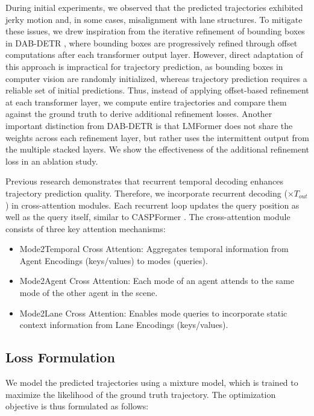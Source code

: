 During initial experiments, we observed that the predicted trajectories exhibited jerky motion and, in some cases, misalignment with lane structures. To mitigate these issues, we drew inspiration from the iterative refinement of bounding boxes in DAB-DETR \cite{liu2022dabdetr}, where bounding boxes are progressively refined through offset computations after each transformer output layer. However, direct adaptation of this approach is impractical for trajectory prediction, as bounding boxes in computer vision are randomly initialized, whereas trajectory prediction requires a reliable set of initial predictions. Thus, instead of applying offset-based refinement at each transformer layer, we compute entire trajectories and compare them against the ground truth to derive additional refinement losses. Another important distinction from DAB-DETR is that LMFormer does not share the weights across each refinement layer, but rather uses the intermittent output from the multiple stacked layers. We show the effectiveness of the additional refinement loss in an ablation study.

Previous research \cite{yadav2025caspformer,zhou2023query} demonstrates that recurrent temporal decoding enhances trajectory prediction quality. Therefore, we incorporate recurrent decoding ($\times T_{out}$) in cross-attention modules. Each recurrent loop updates the query position as well as the query itself, similar to CASPFormer \cite{yadav2025caspformer}. The cross-attention module consists of three key attention mechanisms:
\begin{itemize}
    \item Mode2Temporal Cross Attention: Aggregates temporal information from Agent Encodings (keys/values) to modes (queries).
    \item Mode2Agent Cross Attention: Each mode of an agent attends to the same mode of the other agent in the scene.
    \item Mode2Lane Cross Attention: Enables mode queries to incorporate static context information from Lane Encodings (keys/values).
\end{itemize}

\subsection{Loss Formulation}\label{subsection:loss}
We model the predicted trajectories using a mixture model, which is trained to maximize the likelihood of the ground truth trajectory. The optimization objective is thus formulated as follows:

